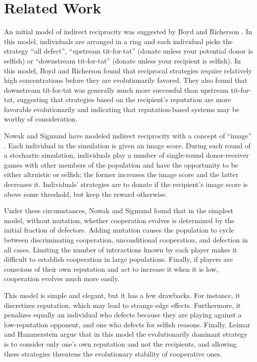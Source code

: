 \documentclass{amsart}
\begin{document}

\section{Related Work}
\label{section-related}

An initial model of indirect reciprocity was suggested by Boyd and
Richerson \cite{boyd_evolution_1989}. In this model, individuals are
arranged in a ring and each individual picks the strategy ``all
defect'', ``upstream tit-for-tat'' (donate unless your potential donor
is selfish) or ``downstream tit-for-tat'' (donate unless your
recipient is selfish). In this model, Boyd and Richerson found that
reciprocal strategies require relatively high concentrations before
they are evolutionarily favored. They also found that downstream
tit-for-tat was generally much more successful than upstream
tit-for-tat, suggesting that strategies based on the recipient's
reputation are more favorable evolutionarily and indicating that
reputation-based systems may be worthy of consideration.

Nowak and Sigmund have modeled indirect reciprocity with a concept of
``image'' \cite{nowak_evolution_1998}. Each individual in the
simulation is given an image score. During each round of a stochastic
simulation, individuals play a number of single-round donor-receiver
games with other members of the population and have the opportunity to
be either altruistic or selfish; the former increases the image score
and the latter decreases it. Individuals’ strategies are to donate if
the recipient’s image score is above some threshold, but keep the
reward otherwise.

Under these circumstances, Nowak and Sigmund found that in the
simplest model, without mutation, whether cooperation evolves is
determined by the initial fraction of defectors. Adding mutation
causes the population to cycle between discriminating cooperation,
unconditional cooperation, and defection in all cases. Limiting the
number of interactions known by each player makes it difficult to
establish cooperation in large populations. Finally, if players are
conscious of their own reputation and act to increase it when it is
low, cooperation evolves much more easily.

This model is simple and elegant, but it has a few drawbacks. For
instance, it discretizes reputation, which may lead to strange edge
effects. Furthermore, it penalizes equally an individual who defects
because they are playing against a low-reputation opponent, and one
who defects for selfish reasons. Finally, Leimar and Hammerstein
\cite{leimar_evolution_2001} argue that in this model the
evolutionarily dominant strategy is to consider only one's own
reputation and not the recipients, and allowing these strategies
threatens the evolutionary stability of cooperative ones.
\end{document}
